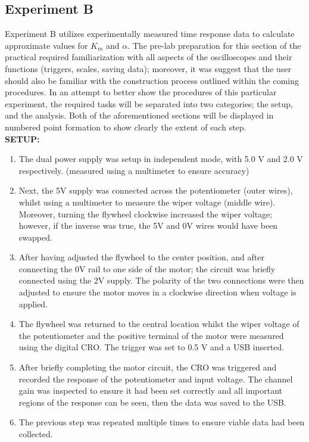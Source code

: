\documentclass[11pt,a4paper]{article}
\begin{document}
\pagebreak
\subsection{Experiment B}
Experiment B utilizes experimentally measured time response data to calculate approximate values for $K_m$ and $\alpha$. The pre-lab preparation for this section of the practical required familiarization with all aspects of the oscilloscopes and their functions (triggers, scales, saving data); moreover, it was suggest that the user should also be familiar with the construction process outlined within the coming procedures.
In an attempt to better show the procedures of this particular experiment, the required tasks will be separated into two categories; the setup, and the analysis. Both of the aforementioned sections will be displayed in numbered point formation to show clearly the extent of each step.\\

\textbf{SETUP:}
\begin{enumerate}
  \item The dual power supply was setup in independent mode, with 5.0 V and 2.0 V respectively. (measured using a multimeter to ensure accuracy)
  \item Next, the 5V supply was connected across the potentiometer (outer wires), whilst using a multimeter to measure the wiper voltage (middle wire). Moreover, turning the flywheel clockwise increased the wiper voltage; however, if the inverse was true, the 5V and 0V wires would have been swapped.
  \item After having adjusted the flywheel to the center position, and after connecting the 0V rail to one side of the motor; the circuit was briefly connected using the 2V supply. The polarity of the two connections were then adjusted to ensure the motor moves in a clockwise direction when voltage is applied. 
  \item The flywheel was returned to the central location whilst the wiper voltage of the potentiometer and the positive terminal of the motor were measured using the digital CRO. The trigger was set to 0.5 V and a USB inserted. 
  \item After briefly completing the motor circuit, the CRO was triggered and recorded the response of the potentiometer and input voltage. The channel gain was inspected to ensure it had been set correctly and all important regions of the response can be seen, then the data was saved to the USB.
  \item The previous step was repeated multiple times to ensure viable data had been collected. \\
\end{enumerate} 
\end{document}
